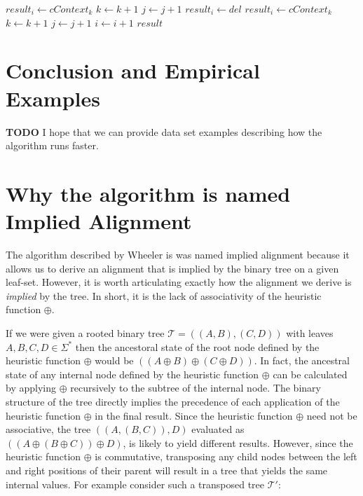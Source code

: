 \documentclass[11pt]{article}
\begin{document}
\begin{algorithm}
\begin{algorithmic}[1]
                  \EndIf
                \EndCase
                  \State $\textit{result}_i \gets \textit{cContext}_k$
                  \State $\textit{k} \gets \textit{k} + 1$
                \EndCase
              \EndSwitch
              \State $\textit{j} \gets \textit{j} + 1$
            \EndCase
                  \State $\textit{result}_i \gets \textit{del}$
                \EndCase
                \Default{}
                  \State $\textit{result}_i \gets \textit{cContext}_k$
                  \State $\textit{k} \gets \textit{k} + 1$
                \EndDefault                
              \EndSwitch
              \State $\textit{j} \gets \textit{j} + 1$
            \EndCase
          \EndSwitch
        \EndIf  
        \State $\textit{i} \gets \textit{i} + 1$
      \EndFor
      \Return $\textit{result}$
    \EndFunction
  \end{algorithmic}
\end{algorithm}


\section{Conclusion and Empirical Examples}
\textbf{TODO}
I hope that we can provide data set examples describing how the algorithm runs faster.


\section{Why the algorithm is named Implied Alignment}
The algorithm described by Wheeler is was named implied alignment because it allows us to derive an alignment that is implied by the binary tree on a given leaf-set. 
However, it is worth articulating exactly how the alignment we derive is \emph{implied} by the tree. 
In short, it is the lack of associativity of the heuristic function $\oplus$.

If we were given a rooted binary tree $\mathcal{T} = ((A,B),(C,D))$ with leaves $A, B, C, D \in \Sigma^{*}$ then the ancestoral state of the root node defined by the heuristic function $\oplus$ would be $((A \oplus B) \oplus (C \oplus D))$. 
In fact, the ancestral state of any internal node defined by the heuristic function $\oplus$ can be calculated by applying $\oplus$ recursively to the subtree of the internal node. 
The binary structure of the tree directly implies the precedence of each application of the heuristic function $\oplus$ in the final result. Since the heuristic function $\oplus$ need not be associative, the tree $((A,(B,C)),D)$ evaluated as $((A \oplus (B \oplus C)) \oplus D)$, is likely to yield different results. 
However, since the heuristic function $\oplus$ is commutative, transposing any child nodes between the left and right positions of their parent will result in a tree that yields the same internal values. 
For example consider such a transposed tree $\mathcal{T'}$:
\end{document}

